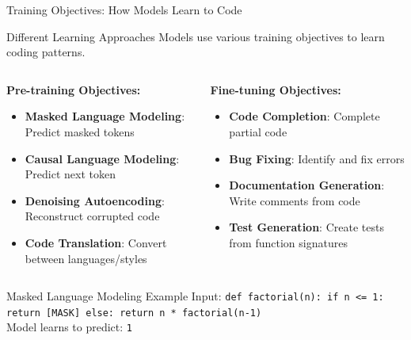 \documentclass{beamer}
\begin{document}
\begin{frame}[t]{Training Objectives: How Models Learn to Code}
    \begin{block}{Different Learning Approaches}
        Models use various training objectives to learn coding patterns.
    \end{block}
    
    \begin{columns}[t]
        \begin{column}{0.5\textwidth}
            \textbf{Pre-training Objectives:}
            \begin{itemize}
                \item \textbf{Masked Language Modeling}: Predict masked tokens
                \item \textbf{Causal Language Modeling}: Predict next token
                \item \textbf{Denoising Autoencoding}: Reconstruct corrupted code
                \item \textbf{Code Translation}: Convert between languages/styles
            \end{itemize}
        \end{column}
        \begin{column}{0.5\textwidth}
            \textbf{Fine-tuning Objectives:}
            \begin{itemize}
                \item \textbf{Code Completion}: Complete partial code
                \item \textbf{Bug Fixing}: Identify and fix errors
                \item \textbf{Documentation Generation}: Write comments from code
                \item \textbf{Test Generation}: Create tests from function signatures
            \end{itemize}
        \end{column}
    \end{columns}
    
    \vspace{0.3cm}
    \begin{exampleblock}{Masked Language Modeling Example}
        Input: \texttt{def factorial(n): if n <= 1: return [MASK] else: return n * factorial(n-1)} \\
        Model learns to predict: \texttt{1}
    \end{exampleblock}
\end{frame}
\end{document}
